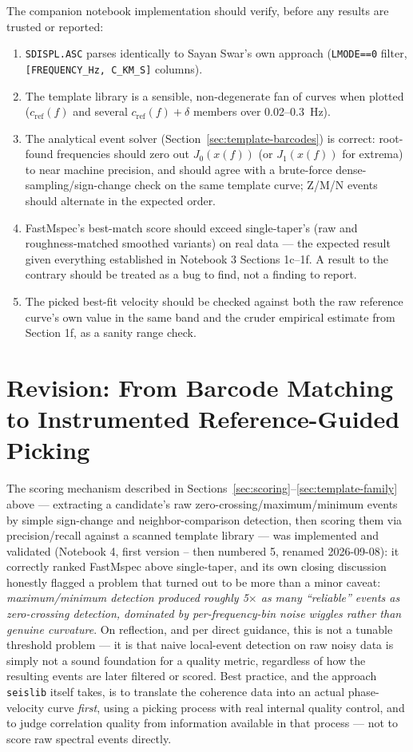 \documentclass[11pt]{article}
\begin{document}
The companion notebook implementation should verify, before any results are trusted or reported:
\begin{enumerate}
  \item \texttt{SDISPL.ASC} parses identically to Sayan Swar's own approach (\texttt{LMODE==0}
    filter, \texttt{[FREQUENCY\_Hz, C\_KM\_S]} columns).
  \item The template library is a sensible, non-degenerate fan of curves when plotted
    ($c_{\text{ref}}(f)$ and several $c_{\text{ref}}(f) + \delta$ members over 0.02--0.3~Hz).
  \item The analytical event solver (Section~\ref{sec:template-barcodes}) is correct: root-found
    frequencies should zero out $J_0(x(f))$ (or $J_1(x(f))$ for extrema) to near machine
    precision, and should agree with a brute-force dense-sampling/sign-change check on the same
    template curve; Z/M/N events should alternate in the expected order.
  \item FastMspec's best-match score should exceed single-taper's (raw and roughness-matched
    smoothed variants) on real data --- the expected result given everything established in
    Notebook 3 Sections 1c--1f. A result to the contrary should be treated as a bug to find, not a
    finding to report.
  \item The picked best-fit velocity should be checked against both the raw reference curve's own
    value in the same band and the cruder empirical estimate from Section 1f, as a sanity range
    check.
\end{enumerate}

\section{Revision: From Barcode Matching to Instrumented Reference-Guided Picking}
\label{sec:revision}

The scoring mechanism described in Sections~\ref{sec:scoring}--\ref{sec:template-family}
above --- extracting a candidate's raw zero-crossing/maximum/minimum events by simple sign-change
and neighbor-comparison detection, then scoring them via precision/recall against a scanned
template library --- was implemented and validated (Notebook 4, first version -- then numbered 5, renamed 2026-09-08): it correctly
ranked FastMspec above single-taper, and its own closing discussion honestly flagged a problem
that turned out to be more than a minor caveat: \emph{maximum/minimum detection produced roughly
5$\times$ as many ``reliable'' events as zero-crossing detection, dominated by per-frequency-bin
noise wiggles rather than genuine curvature}. On reflection, and per direct guidance, this is not
a tunable threshold problem --- it is that naive local-event detection on raw noisy data is simply
not a sound foundation for a quality metric, regardless of how the resulting events are later
filtered or scored. Best practice, and the approach \texttt{seislib} itself takes, is to translate the
coherence data into an actual phase-velocity curve \emph{first}, using a picking process with real
internal quality control, and to judge correlation quality from information available in that
process --- not to score raw spectral events directly.
\end{document}
